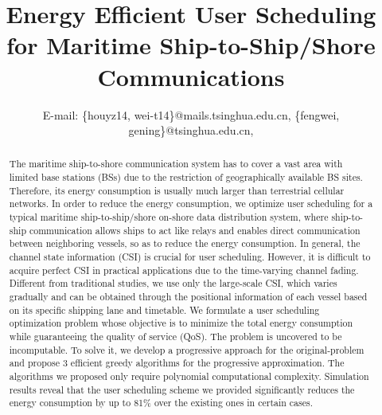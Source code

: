 \documentclass[conference]{IEEEtran}
\begin{document}
\title{Energy Efficient User Scheduling for Maritime Ship-to-Ship/Shore Communications}

\author{
 E-mail: \{houyz14, wei-t14\}@mails.tsinghua.edu.cn, \{fengwei, gening\}@tsinghua.edu.cn, %
}





\maketitle

\begin{abstract}

The maritime ship-to-shore communication system has to cover a vast area with limited base stations (BSs) due to the restriction of geographically available BS sites. Therefore, its energy consumption is usually much larger than terrestrial cellular networks. In order to reduce the energy consumption, we optimize user scheduling for a typical maritime ship-to-ship/shore on-shore data distribution system, where ship-to-ship communication allows ships to act like relays and enables direct communication between neighboring vessels, so as to reduce the energy consumption. 
In general, the channel state information (CSI) is crucial for user scheduling. However, it is difficult to acquire perfect CSI in practical applications due to the time-varying channel fading. Different from traditional studies, we use only the large-scale CSI, which varies gradually and can be obtained through the positional information of each vessel based on its specific shipping lane and timetable. 
We formulate a user scheduling optimization problem whose objective is to minimize the total energy consumption while guaranteeing the quality of service (QoS). The problem is uncovered to be incomputable. To solve it, we develop a progressive approach for the original-problem and propose 3 efficient greedy algorithms for the progressive approximation. The algorithms we proposed only require polynomial computational complexity. Simulation results reveal that the user scheduling scheme we provided significantly reduces the energy consumption by up to 81\% over the existing ones in certain cases.
\end{abstract}
\end{document}

